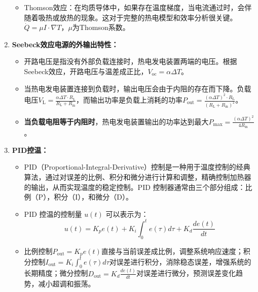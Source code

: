 \documentclass[dvipsnames, svgnames,a4paper,11pt]{article}
\begin{document}
\begin{enumerate}
\begin{itemize}
                    \item Thomson效应：在均质导体中，如果存在温度梯度，当电流通过时，会伴随着吸热或放热的现象。这对于完整的热电模型和效率分析很关键。$\dot{Q}=\mu I\cdot \nabla T$，$\mu$为Thomson系数。
        
        
                \end{itemize}




            \item \textbf{Seebeck效应电源的外输出特性：}
            

                
                \begin{itemize}
                    \item 开路电压是指没有外部负载连接时，热电发电装置两端的电压。根据Seebeck效应，开路电压与温差成正比，$V_{\text{oc}} = \alpha \Delta T$。
                    
                    \item 当热电发电装置连接到负载时，输出电压会由于内阻的存在而下降。负载电压$V_{\text{L}} = \frac{\alpha \Delta T \cdot R_{\text{L}}}{R_{\text{L}} + R_{\text{in}}}$，而输出功率是负载上消耗的功率$P_{\text{out}} = \frac{(\alpha \Delta T)^2 \cdot R_{\text{L}}}{(R_{\text{L}} + R_{\text{in}})^2}$。
                    
                    \item \textbf{当负载电阻等于内阻时}，热电发电装置输出的功率达到最大$P_{\text{max}} = \frac{(\alpha \Delta T)^2}{4 R_{\text{in}}}$。				
                \end{itemize}	





            \item \textbf{PID控温：}
            

                \begin{itemize}
                    \item PID（Proportional-Integral-Derivative）控制是一种用于温度控制的经典算法，通过对误差的比例、积分和微分进行计算和调整，精确控制加热器的输出，从而实现温度的稳定控制。PID 控制器通常由三个部分组成：比例（P），积分（I），和微分（D）。
                    
                    \item PID 控温的控制量 $u(t)$ 可以表示为：$$u(t) = K_p e(t) + K_i \int_0^t e(\tau) d\tau + K_d \frac{d e(t)}{dt}$$
                    
                    \item 比例控制$P_{\text{out}} = K_p e(t)$直接与当前误差成比例，调整系统响应速度；积分控制$I_{\text{out}} = K_i \int_0^t e(\tau) d\tau$对误差进行积分，消除稳态误差，增强系统的长期精度；微分控制$D_{\text{out}} = K_d \frac{d e(t)}{dt}$对误差进行微分，预测误差变化趋势，减小超调和振荡。
                \end{itemize}	



      \end{enumerate}
\end{document}
